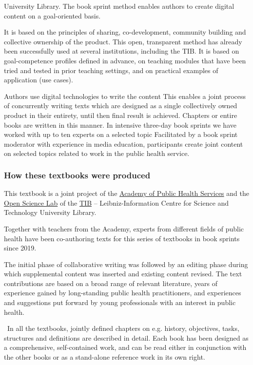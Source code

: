 \documentclass{article}
\begin{document}
University Library. The book sprint method enables authors to create digital content on a goal-oriented basis.


It is based on the principles of sharing, co-development, community building and collective ownership of the product. This open, transparent method has already been successfully used at several institutions, including the TIB. It is based on goal-competence profiles defined in advance, on teaching modules that have been tried and tested in prior teaching settings, and on practical examples of application (use cases).


Authors use digital technologies to write the content This enables a joint process of concurrently writing texts which are designed as a single collectively owned product in their entirety, until then final result is achieved. Chapters or entire books are written in this manner. In intensive three-day book sprints we have worked with up to ten experts on a selected topic Facilitated by a book sprint moderator with experience in media education, participants create joint content on selected topics related to work in the public health service.


\subsubsection{How these textbooks were produced}\label{H691848}



This textbook is a joint project of the \href{https://www.akademie-oegw.de/startseite.html}{Academy of Public Health Services} and the \href{https://www.tib.eu/en/research-development/open-science}{Open Science Lab} of the \href{https://www.tib.eu/}{TIB} – Leibniz-Information Centre for Science and Technology University Library.


Together with teachers from the Academy, experts from different fields of public health have been co-authoring texts for this series of textbooks in book sprints since 2019.


The initial phase of collaborative writing was followed by an editing phase during which supplemental content was inserted and existing content revised. The text contributions are based on a broad range of relevant literature, years of experience gained by long-standing public health practitioners, and experiences and suggestions put forward by young professionals with an interest in public health.


 In all the textbooks, jointly defined chapters on e.g. history, objectives, tasks, structures and definitions are described in detail. Each book has been designed as a comprehensive, self-contained work, and can be read either in conjunction with the other books or as a stand-alone reference work in its own right.
\end{document}
